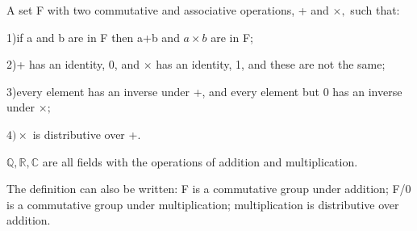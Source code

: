 A set F with two commutative and associative operations, 
+ and \ensuremath{ \times ,} such that:
\par
1)if a and b are in F then a+b and \ensuremath{a \times b} are in F;
\par
2)+ has an identity, 0, and \ensuremath{ \times } has an identity, 1, and
these are not the same;
\par
3)every element has an inverse under +, and every element but
0 has an inverse under \ensuremath{ \times ;}
\par
\ensuremath{4) \times } is distributive over +.
\par
 $ \mathbb {Q,R,C} $ are all fields with the operations of addition 
and multiplication.
\par
The definition can also be written: F is a commutative group under 
addition; F/{0} is a commutative group under multiplication; 
multiplication is distributive over addition.
